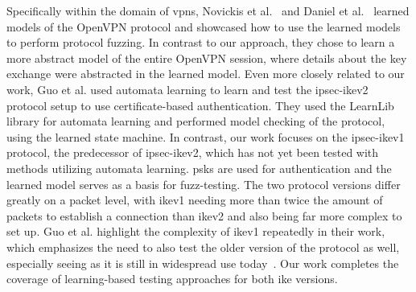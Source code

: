 Specifically within the domain of \acp{vpn}, Novickis et al.~\cite{novickis2016protocol} and Daniel et al.~\cite{daniel2018inferring} learned models of the OpenVPN protocol and showcased how to use the learned models to perform protocol fuzzing. In contrast to our approach, they chose to learn a more abstract model of the entire OpenVPN session, where details about the key exchange were abstracted in the learned model. 
Even more closely related to our work, Guo et al. \cite{guo2019model} used automata learning to learn and test the \ac{ipsec}-\ac{ike}v2 protocol setup to use certificate-based authentication. They used the LearnLib~\cite{software:learnlib} library for automata learning and performed model checking of the protocol, using the learned state machine. In contrast, our work focuses on the \ac{ipsec}-\ac{ike}v1 protocol, the predecessor of \ac{ipsec}-\ac{ike}v2, which has not yet been tested with methods utilizing automata learning. \Acp{psk} are used for authentication and the learned model serves as a basis for fuzz-testing. The two protocol versions differ greatly on a packet level, with \ac{ike}v1 needing more than twice the amount of packets to establish a connection than \ac{ike}v2 and also being far more complex to set up.  Guo et al. highlight the complexity of \ac{ike}v1 repeatedly in their work, which emphasizes the need to also test the older version of the protocol as well, especially seeing as it is still in widespread use today~\cite{avm2022}. Our work completes the coverage of learning-based testing approaches for both \ac{ike} versions.

